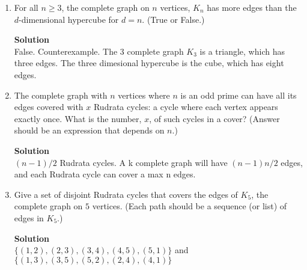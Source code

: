 \documentclass[11pt]{article}
\newenvironment{Parts}{\begin{enumerate}[label=(\alph*)]}{\end{enumerate}}
\newcommand*{\Part}{\item}
\begin{document}
\begin{Parts}
\begin{mdframed} \textbf{Solution} \\
110,111,101,100,000,001,011,010 
\end{mdframed}

\Part
For all $n \geq 3$, the complete graph on $n$ vertices, $K_n$ has more
edges than the $d$-dimensional hypercube for $d=n$. (True or False.)

\begin{mdframed} \textbf{Solution} \\
False. Counterexample. The 3 complete graph $K_3$ is a triangle, which has three edges. The three dimesional hypercube is the cube, which has eight edges. 
\end{mdframed}

\Part
The complete graph with $n$ vertices where $n$ is an odd prime can have all its edges
covered with $x$ Rudrata cycles: a cycle where
each vertex appears exactly once. What is the number, $x$,  of
such cycles in a cover? (Answer should be an expression that depends on $n$.)

\begin{mdframed} \textbf{Solution} \\
$(n-1)/2$ Rudrata cycles. A k complete graph will have $(n-1)n/2$ edges, and each Rudrata cycle can cover a max n edges.  
\end{mdframed}

\Part
Give a set of disjoint Rudrata cycles that covers the edges of $K_5$, the complete
graph on $5$ vertices.
(Each path should be a sequence (or list) of edges in $K_5$.)

\begin{mdframed} \textbf{Solution} \\
$\{(1,2),(2,3),(3,4),(4,5),(5,1)\}$ and $\{(1,3),(3,5),(5,2),(2,4),(4,1)\}$
\end{mdframed}

\end{Parts}

\end{document}
